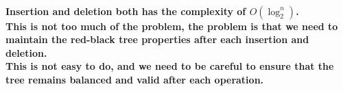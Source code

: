 \documentclass{article}
\begin{document}
\paragraph{
    Insertion and deletion both has the complexity of $O(\log_2^n)$.\\
    This is not too much of the problem, the problem is that we need to maintain the red-black tree properties after each insertion and deletion.\\
    This is not easy to do, and we need to be careful to ensure that the tree remains balanced and valid after each operation.\\
}


\begin{figure}[H]
    \centering
\end{figure}
\end{document}
